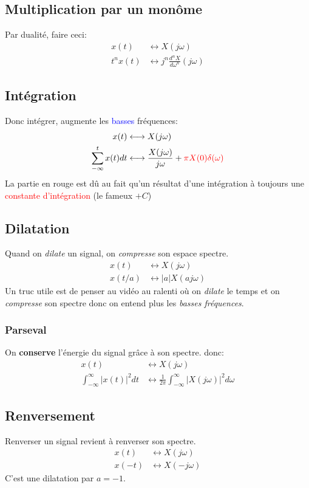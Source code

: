 \documentclass{report}
\begin{document}
\subsection{Multiplication par un monôme}
Par dualité, faire ceci:
\begin{align*}
x(t) &\longleftrightarrow X(j\omega)\\
t^nx(t) &\longleftrightarrow j^n \frac{d^nX}{d\omega^n} (j\omega)
\end{align*}
\subsection{Intégration}
Donc intégrer, augmente les \textcolor{blue}{basses} fréquences:
\begin{align*}
x(t) &\longleftrightarrow X(j\omega)\\
\sum_{-\infty}^t	x(t)dt &\longleftrightarrow \frac{X(j\omega)}{j\omega} + \textcolor{red}{\pi X(0) \delta(\omega)}
\end{align*}
La partie en rouge est dû au fait qu'un résultat d'une intégration à toujours une \textcolor{red}{constante d'intégration} (le fameux $+C$)

\subsection{Dilatation}
Quand on \textit{dilate} un signal, on \textit{compresse} son espace spectre.
\begin{align*}
x(t) &\longleftrightarrow X(j\omega)\\
x(t/a) &\longleftrightarrow |a|X(aj\omega)
\end{align*}
Un truc utile est de penser au vidéo au ralenti où on \textit{dilate} le temps et on \textit{compresse} son spectre donc on entend plus les \textit{basses fréquences}.

\subsubsection{Parseval}
On \textbf{conserve} l'énergie du signal grâce à son spectre. donc:
\begin{align*}
x(t) &\longleftrightarrow X(j\omega)\\
\int_{-\infty}^{\infty} |x(t)|^2 dt &\longleftrightarrow \frac{1}{2\pi} \int_{-\infty}^{\infty} |X(j\omega)|^2 d\omega
\end{align*}

\subsection{Renversement}
Renverser un signal revient à renverser son spectre.
\begin{align*}
x(t) &\longleftrightarrow X(j\omega)\\
x(-t) &\longleftrightarrow X(-j\omega)
\end{align*}
C'est une dilatation par $a = -1$.
\end{document}
